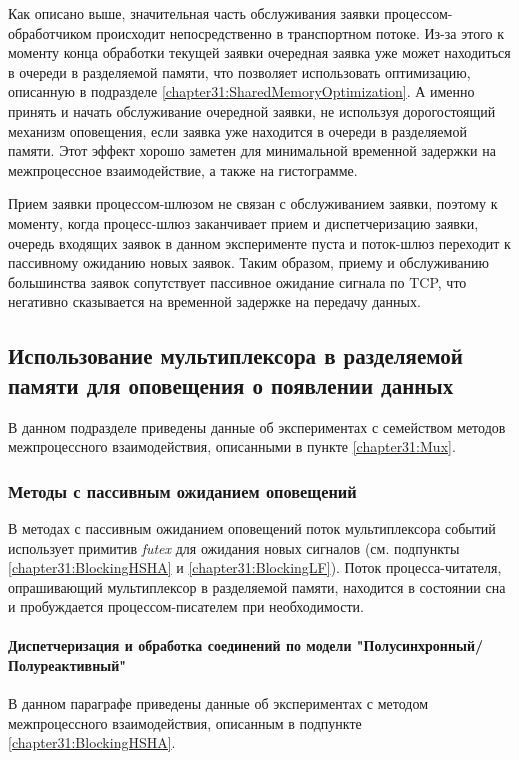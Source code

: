 Как описано выше, значительная часть обслуживания заявки процессом-обработчиком происходит непосредственно в транспортном потоке. Из-за этого к моменту конца обработки текущей заявки очередная заявка уже может находиться в очереди в разделяемой памяти, что позволяет использовать оптимизацию, описанную в подразделе \ref{chapter31:SharedMemoryOptimization}. А именно принять и начать обслуживание очередной заявки, не используя дорогостоящий механизм оповещения, если заявка уже находится в очереди в разделяемой памяти. Этот эффект хорошо заметен для минимальной временной задержки на межпроцессное взаимодействие, а также на гистограмме.

Прием заявки процессом-шлюзом не связан с обслуживанием заявки, поэтому к моменту, когда процесс-шлюз заканчивает прием и диспетчеризацию заявки, очередь входящих заявок в данном эксперименте пуста и поток-шлюз переходит к пассивному ожиданию новых заявок. Таким образом, приему и обслуживанию большинства заявок сопутствует пассивное ожидание сигнала по TCP, что негативно сказывается на временной задержке на передачу данных.

\subsection{Использование мультиплексора в разделяемой памяти для оповещения о появлении данных}

В данном подразделе приведены данные об экспериментах с семейством методов межпроцессного взаимодействия, описанными в пункте \ref{chapter31:Mux}.

\subsubsection{Методы с пассивным ожиданием оповещений}

В методах с пассивным ожиданием оповещений поток мультиплексора событий использует примитив \textit{futex} 
для ожидания новых сигналов (см. подпункты \ref{chapter31:BlockingHSHA} и \ref{chapter31:BlockingLF}). Поток процесса-читателя, опрашивающий мультиплексор в разделяемой памяти, находится в состоянии сна и пробуждается процессом-писателем при необходимости.

\paragraph{Диспетчеризация и обработка соединений по модели "Полусинхронный/Полуреактивный"}

В данном параграфе приведены данные об экспериментах с методом межпроцессного взаимодействия, описанным в подпункте \ref{chapter31:BlockingHSHA}.

